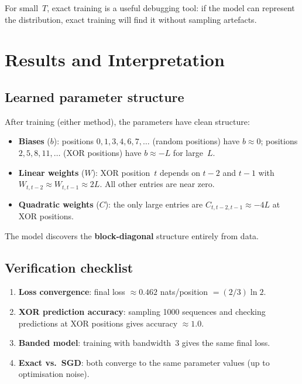 \documentclass[11pt]{article}
\begin{document}
For small~$T$, exact training is a useful debugging tool: if the model
can represent the distribution, exact training will find it without
sampling artefacts.

\section{Results and Interpretation}\label{sec:results}

\subsection{Learned parameter structure}

After training (either method), the parameters have clean structure:
\begin{itemize}
  \item \textbf{Biases} ($b$): positions $0, 1, 3, 4, 6, 7, \ldots$
        (random positions) have $b \approx 0$; positions
        $2, 5, 8, 11, \ldots$ (XOR positions) have $b \approx -L$ for
        large~$L$.
  \item \textbf{Linear weights} ($W$): XOR position~$t$ depends on
        $t{-}2$ and $t{-}1$ with $W_{t,t-2} \approx W_{t,t-1} \approx 2L$.
        All other entries are near zero.
  \item \textbf{Quadratic weights} ($C$): the only large entries are
        $C_{t,t-2,t-1} \approx -4L$ at XOR positions.
\end{itemize}
The model discovers the \textbf{block-diagonal} structure entirely from
data.

\subsection{Verification checklist}

\begin{enumerate}
  \item \textbf{Loss convergence}: final loss
        $\approx 0.462$ nats/position $= (2/3)\ln 2$. \checkmark
  \item \textbf{XOR prediction accuracy}: sampling 1000 sequences and
        checking predictions at XOR positions gives accuracy
        $\approx 1.0$. \checkmark
  \item \textbf{Banded model}: training with bandwidth~$3$ gives the
        same final loss. \checkmark
  \item \textbf{Exact vs.\ SGD}: both converge to the same parameter
        values (up to optimisation noise). \checkmark
\end{enumerate}
\end{document}
